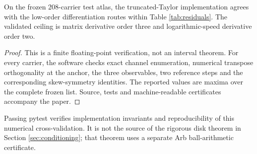 \begin{proposition}
\label{prop:validationceiling}
On the frozen 208-carrier test atlas, the truncated-Taylor implementation agrees with the low-order differentiation routes within Table \ref{tab:residuals}.  The validated ceiling is matrix derivative order three and logarithmic-speed derivative order two.
\end{proposition}

\begin{proof}
This is a finite floating-point verification, not an interval theorem.  For every carrier, the software checks exact channel enumeration, numerical transpose orthogonality at the anchor, the three observables, two reference steps and the corresponding skew-symmetry identities.  The reported values are maxima over the complete frozen list.  Source, tests and machine-readable certificates accompany the paper.
\end{proof}

\begin{remark}
Passing pytest verifies implementation invariants and reproducibility of this numerical cross-validation.  It is not the source of the rigorous disk theorem in Section \ref{sec:conditioning}; that theorem uses a separate Arb ball-arithmetic certificate.
\end{remark}
